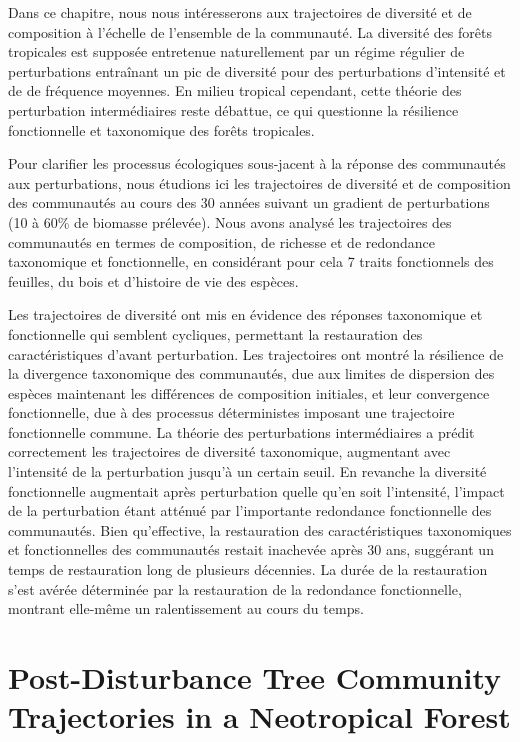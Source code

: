 \documentclass[
  11pt,
  french,
  A4paper,
  extrafontsizes,onecolumn,openright
  ]{memoir}
\begin{document}
Dans ce chapitre, nous nous intéresserons aux trajectoires de diversité
et de composition à l'échelle de l'ensemble de la communauté. La
diversité des forêts tropicales est supposée entretenue naturellement
par un régime régulier de perturbations entraînant un pic de diversité
pour des perturbations d'intensité et de de fréquence moyennes. En
milieu tropical cependant, cette théorie des perturbation intermédiaires
reste débattue, ce qui questionne la résilience fonctionnelle et
taxonomique des forêts tropicales.

Pour clarifier les processus écologiques sous-jacent à la réponse des
communautés aux perturbations, nous étudions ici les trajectoires de
diversité et de composition des communautés au cours des 30 années
suivant un gradient de perturbations (10 à 60\% de biomasse prélevée).
Nous avons analysé les trajectoires des communautés en termes de
composition, de richesse et de redondance taxonomique et fonctionnelle,
en considérant pour cela 7 traits fonctionnels des feuilles, du bois et
d'histoire de vie des espèces.

Les trajectoires de diversité ont mis en évidence des réponses
taxonomique et fonctionnelle qui semblent cycliques, permettant la
restauration des caractéristiques d'avant perturbation. Les trajectoires
ont montré la résilience de la divergence taxonomique des communautés,
due aux limites de dispersion des espèces maintenant les différences de
composition initiales, et leur convergence fonctionnelle, due à des
processus déterministes imposant une trajectoire fonctionnelle commune.
La théorie des perturbations intermédiaires a prédit correctement les
trajectoires de diversité taxonomique, augmentant avec l'intensité de la
perturbation jusqu'à un certain seuil. En revanche la diversité
fonctionnelle augmentait après perturbation quelle qu'en soit
l'intensité, l'impact de la perturbation étant atténué par l'importante
redondance fonctionnelle des communautés. Bien qu'effective, la
restauration des caractéristiques taxonomiques et fonctionnelles des
communautés restait inachevée après 30 ans, suggérant un temps de
restauration long de plusieurs décennies. La durée de la restauration
s'est avérée déterminée par la restauration de la redondance
fonctionnelle, montrant elle-même un ralentissement au cours du temps.

\newpage

\section*{Post-Disturbance Tree Community Trajectories in a Neotropical
Forest}\label{post-disturbance-tree-community-trajectories-in-a-neotropical-forest}
\end{document}
